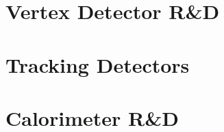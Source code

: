 \documentclass[10pt]{report}
\begin{document}
\tableofcontents
\chapter{Vertex Detector R\&D}







\chapter{Tracking Detectors}



\chapter{Calorimeter R\&D}









\printbibliography
\end{document}
